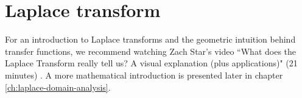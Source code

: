 \section{Laplace transform}

For an introduction to Laplace transforms and the geometric intuition behind
transfer functions, we recommend watching Zach Star's video ``What does the
Laplace Transform really tell us? A visual explanation (plus applications)" (21
minutes) \cite{bib:laplace_transform}. A more mathematical introduction is
presented later in chapter \ref{ch:laplace-domain-analysis}.
